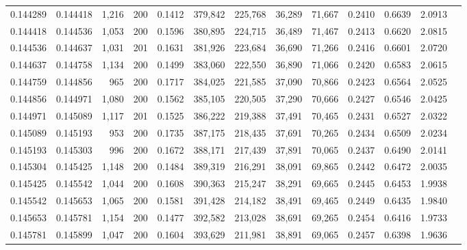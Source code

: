\begin{tabular}{rrrrrrrrrrrrr}
0.144289 & 0.144418 &  1,216 & 200 &                                     0.1412 & 379,842 & 225,768 &  36,289 &  71,667 & 0.2410 & 0.6639 & 2.0913 \\
0.144418 & 0.144536 &  1,053 & 200 &                                     0.1596 & 380,895 & 224,715 &  36,489 &  71,467 & 0.2413 & 0.6620 & 2.0815 \\
0.144536 & 0.144637 &  1,031 & 201 &                                     0.1631 & 381,926 & 223,684 &  36,690 &  71,266 & 0.2416 & 0.6601 & 2.0720 \\
0.144637 & 0.144758 &  1,134 & 200 &                                     0.1499 & 383,060 & 222,550 &  36,890 &  71,066 & 0.2420 & 0.6583 & 2.0615 \\
0.144759 & 0.144856 &    965 & 200 &                                     0.1717 & 384,025 & 221,585 &  37,090 &  70,866 & 0.2423 & 0.6564 & 2.0525 \\
0.144856 & 0.144971 &  1,080 & 200 &                                     0.1562 & 385,105 & 220,505 &  37,290 &  70,666 & 0.2427 & 0.6546 & 2.0425 \\
0.144971 & 0.145089 &  1,117 & 201 &                                     0.1525 & 386,222 & 219,388 &  37,491 &  70,465 & 0.2431 & 0.6527 & 2.0322 \\
0.145089 & 0.145193 &    953 & 200 &                                     0.1735 & 387,175 & 218,435 &  37,691 &  70,265 & 0.2434 & 0.6509 & 2.0234 \\
0.145193 & 0.145303 &    996 & 200 &                                     0.1672 & 388,171 & 217,439 &  37,891 &  70,065 & 0.2437 & 0.6490 & 2.0141 \\
0.145304 & 0.145425 &  1,148 & 200 &                                     0.1484 & 389,319 & 216,291 &  38,091 &  69,865 & 0.2442 & 0.6472 & 2.0035 \\
0.145425 & 0.145542 &  1,044 & 200 &                                     0.1608 & 390,363 & 215,247 &  38,291 &  69,665 & 0.2445 & 0.6453 & 1.9938 \\
0.145542 & 0.145653 &  1,065 & 200 &                                     0.1581 & 391,428 & 214,182 &  38,491 &  69,465 & 0.2449 & 0.6435 & 1.9840 \\
0.145653 & 0.145781 &  1,154 & 200 &                                     0.1477 & 392,582 & 213,028 &  38,691 &  69,265 & 0.2454 & 0.6416 & 1.9733 \\
0.145781 & 0.145899 &  1,047 & 200 &                                     0.1604 & 393,629 & 211,981 &  38,891 &  69,065 & 0.2457 & 0.6398 & 1.9636 \\

\end{tabular}
